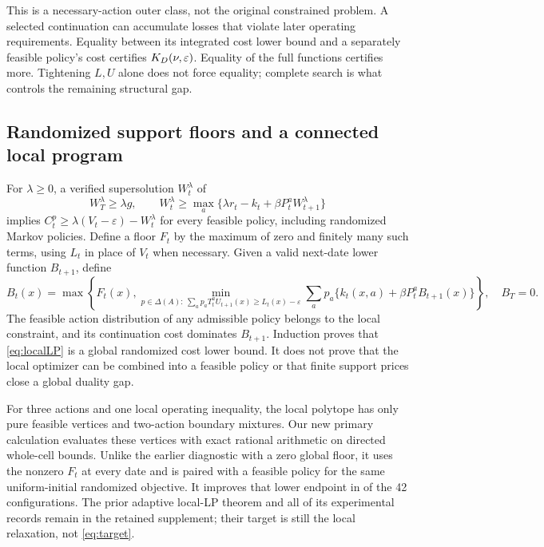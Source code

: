 This is a necessary-action outer class, not the original constrained problem. A selected continuation can accumulate losses that violate later operating requirements. Equality between its integrated cost lower bound and a separately feasible policy's cost certifies $K_D(\nu,\varepsilon)$. Equality of the full functions certifies more. Tightening $L,U$ alone does not force equality; complete search is what controls the remaining structural gap.

\subsection{Randomized support floors and a connected local program}\label{sec:local}
For $\lambda\geq0$, a verified supersolution $W_t^\lambda$ of
\[
 W_T^\lambda\geq\lambda g,\qquad
 W_t^\lambda\geq\max_a\{\lambda r_t-k_t+\beta P_t^aW_{t+1}^\lambda\}
\]
implies $C_t^p\geq\lambda(V_t-\varepsilon)-W_t^\lambda$ for every feasible policy, including randomized Markov policies. Define a floor $F_t$ by the maximum of zero and finitely many such terms, using $L_t$ in place of $V_t$ when necessary. Given a valid next-date lower function $B_{t+1}$, define
\begin{equation}\label{eq:localLP}
 B_t(x)=\max\left\{F_t(x),\min_{p\in\Delta(A):\ \sum_ap_aT_t^aU_{t+1}(x)\geq L_t(x)-\varepsilon}
 \sum_ap_a\{k_t(x,a)+\beta P_t^aB_{t+1}(x)\}\right\},\quad B_T=0.
\end{equation}
The feasible action distribution of any admissible policy belongs to the local constraint, and its continuation cost dominates $B_{t+1}$. Induction proves that \eqref{eq:localLP} is a global randomized cost lower bound. It does not prove that the local optimizer can be combined into a feasible policy or that finite support prices close a global duality gap.

For three actions and one local operating inequality, the local polytope has only pure feasible vertices and two-action boundary mixtures. Our new primary calculation evaluates these vertices with exact rational arithmetic on directed whole-cell bounds. Unlike the earlier diagnostic with a zero global floor, it uses the nonzero $F_t$ at every date and is paired with a feasible policy for the same uniform-initial randomized objective. It improves that lower endpoint in \LocalImproveCount{} of the 42 configurations. The prior adaptive local-LP theorem and all of its experimental records remain in the retained supplement; their target is still the local relaxation, not \eqref{eq:target}.

